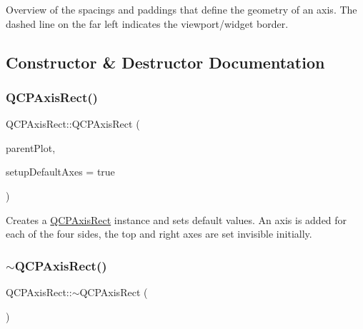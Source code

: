  \begin{center}Overview of the spacings and paddings that define the geometry of an axis. The dashed line on the far left indicates the viewport/widget border.\end{center}  

\subsection{Constructor \& Destructor Documentation}
\mbox{\label{class_q_c_p_axis_rect_a60b31dece805462c1b82eea2e69ba042}} 
\subsubsection{\texorpdfstring{QCPAxisRect()}{QCPAxisRect()}}
{\footnotesize\ttfamily Q\+C\+P\+Axis\+Rect\+::\+Q\+C\+P\+Axis\+Rect (\begin{DoxyParamCaption}\item[{\mbox{\hyperlink{class_q_custom_plot}{Q\+Custom\+Plot}} $\ast$}]{parent\+Plot,  }\item[{bool}]{setup\+Default\+Axes = {\ttfamily true} }\end{DoxyParamCaption})\hspace{0.3cm}{\ttfamily [explicit]}}

Creates a \mbox{\hyperlink{class_q_c_p_axis_rect}{Q\+C\+P\+Axis\+Rect}} instance and sets default values. An axis is added for each of the four sides, the top and right axes are set invisible initially. \mbox{\label{class_q_c_p_axis_rect_a463c44b1856ddbf82eb3f7b582839cd0}} 
\subsubsection{\texorpdfstring{$\sim$QCPAxisRect()}{~QCPAxisRect()}}
{\footnotesize\ttfamily Q\+C\+P\+Axis\+Rect\+::$\sim$\+Q\+C\+P\+Axis\+Rect (\begin{DoxyParamCaption}{ }\end{DoxyParamCaption})\hspace{0.3cm}{\ttfamily [virtual]}}



